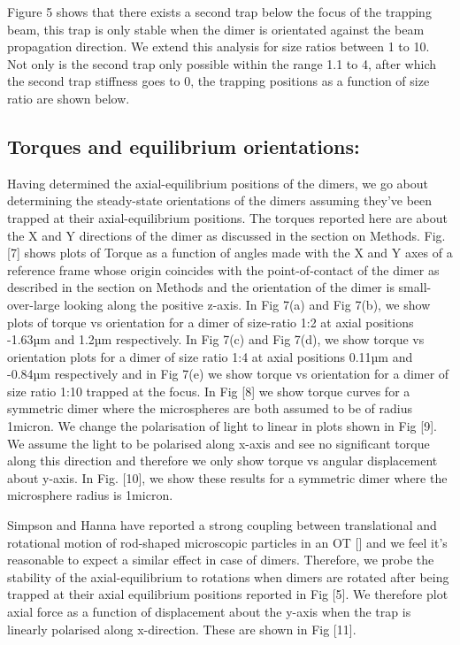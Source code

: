 \documentclass[preprint,  3p]{elsarticle}
\begin{document}
Figure 5 shows that there exists a second trap below the focus of the trapping beam, this trap is only stable when the dimer is orientated against the beam propagation direction. We extend this analysis for size ratios between 1 to 10. Not only is the second trap only possible within the range 1.1 to 4, after which the second trap stiffness goes to 0, the trapping positions as a function of size ratio are shown below.


\subsection{Torques and equilibrium orientations:}

Having determined the axial-equilibrium positions of the dimers, we go about determining the steady-state orientations of the dimers assuming they’ve been trapped at their axial-equilibrium positions. The torques reported here are about the X and Y directions of the dimer as discussed in the section on Methods. Fig. [7] shows plots of Torque as a function of angles made with the X and Y axes of a reference frame whose origin coincides with the point-of-contact of the dimer as described in the section on Methods and the orientation of the dimer is small-over-large looking along the positive z-axis. In Fig 7(a) and Fig 7(b), we show plots of torque vs orientation for a dimer of size-ratio 1:2 at axial positions -1.63µm and 1.2µm respectively. In Fig 7(c) and Fig 7(d), we show torque vs orientation plots for a dimer of size ratio 1:4 at axial positions 0.11µm and -0.84µm respectively and in Fig 7(e) we show torque vs orientation for a dimer of size ratio 1:10 trapped at the focus. In Fig [8] we show torque curves for a symmetric dimer where the microspheres are both assumed to be of radius 1micron. We change the polarisation of light to linear in plots shown in Fig [9]. We assume the light to be polarised along x-axis and see no significant torque along this direction and therefore we only show torque vs angular displacement about y-axis. In Fig. [10], we show these results for a symmetric dimer where the microsphere radius is 1micron. 

Simpson and Hanna have reported a strong coupling between translational and rotational motion of rod-shaped microscopic particles in an OT [] and we feel it’s reasonable to expect a similar effect in case of dimers. Therefore, we probe the stability of the axial-equilibrium to rotations when dimers are rotated after being trapped at their axial equilibrium positions reported in Fig [5]. We therefore plot axial force as a function of displacement about the y-axis when the trap is linearly polarised along x-direction. These are shown in Fig [11]. 
\end{document}
